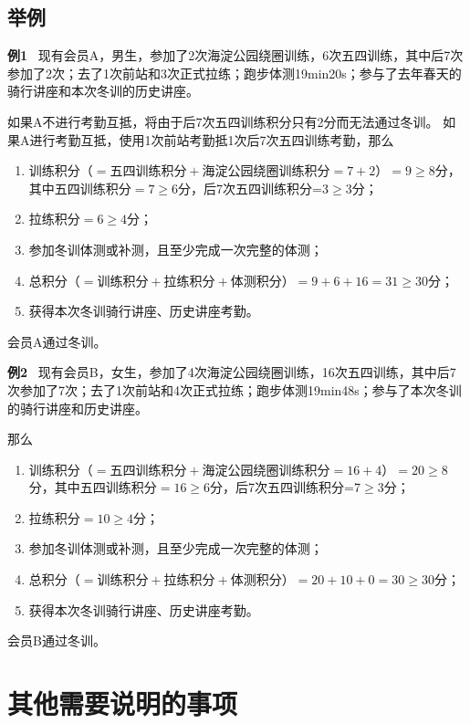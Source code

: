 \documentclass[UTF8]{ctexart}
\begin{document}
\subsection{举例}
\small{
    \textbf{例1} \ 现有会员A，男生，参加了2次海淀公园绕圈训练，6次五四训练，其中后7次参加了2次；去了1次前站和3次正式拉练；跑步体测19min20s；参与了去年春天的骑行讲座和本次冬训的历史讲座。

如果A不进行考勤互抵，将由于后7次五四训练积分只有2分而无法通过冬训。
如果A进行考勤互抵，使用1次前站考勤抵1次后7次五四训练考勤，那么
\begin{enumerate}[nosep,left=4em]
    \item 训练积分（$=\text{五四训练积分}+\text{海淀公园绕圈训练积分}=7+2$）$=9\ge 8$分，其中五四训练积分$=7\ge 6$分，后7次五四训练积分=3$\ge 3$分；
    \item 拉练积分$=6\ge 4$分；
    \item 参加冬训体测或补测，且至少完成一次完整的体测；
    \item 总积分（$=\text{训练积分}+\text{拉练积分}+\text{体测积分}$）$=9+6+16=31\ge 30$分；
    \item 获得本次冬训骑行讲座、历史讲座考勤。
\end{enumerate}

会员A通过冬训。\\
}

\small{
    \textbf{例2} \ 现有会员B，女生，参加了4次海淀公园绕圈训练，16次五四训练，其中后7次参加了7次；去了1次前站和4次正式拉练；跑步体测19min48s；参与了本次冬训的骑行讲座和历史讲座。

那么
\begin{enumerate}[nosep,left=4em]
    \item 训练积分（$=\text{五四训练积分}+\text{海淀公园绕圈训练积分}=16+4$）$=20\ge 8$分，其中五四训练积分$=16\ge 6$分，后7次五四训练积分=7$\ge 3$分；
    \item 拉练积分$=10\ge 4$分；
    \item 参加冬训体测或补测，且至少完成一次完整的体测；
    \item 总积分（$=\text{训练积分}+\text{拉练积分}+\text{体测积分}$）$=20+10+0=30\ge 30$分；
    \item 获得本次冬训骑行讲座、历史讲座考勤。
\end{enumerate}

会员B通过冬训。

}



\section{其他需要说明的事项}
\end{document}
